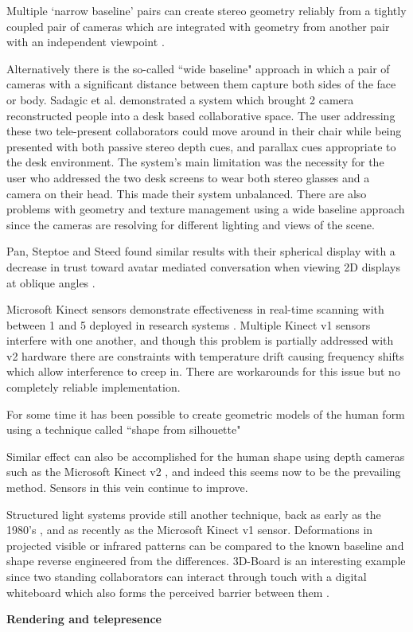 Multiple `narrow baseline' pairs can create stereo geometry reliably from a tightly coupled pair of cameras which are integrated with geometry from another pair with an independent viewpoint \cite{Okutomi:1993ez, Cooke2002, Cooke2002a}. \par
Alternatively there is the so-called ``wide baseline" approach in which a pair of cameras with a significant distance between them capture both sides of the face or body. Sadagic et al. demonstrated a system which brought 2 camera reconstructed \cite{Sadagic2001} people into a desk based collaborative space. The user addressing these two tele-present collaborators could move around in their chair while being presented with both passive stereo depth cues, and parallax cues appropriate to the desk environment. The system's main limitation was the necessity for the user who addressed the two desk screens to wear both stereo glasses and a camera on their head. This made their system unbalanced.  There are also problems with geometry and texture management using a wide baseline approach since the cameras are resolving for different lighting and views of the scene.\par
      Pan, Steptoe and Steed found similar results with their spherical display with a decrease in trust toward avatar mediated conversation when viewing 2D displays at oblique angles \cite{pan2014comparing}.\par
Microsoft Kinect sensors demonstrate effectiveness in real-time scanning with between 1 and 5 deployed in research systems \cite{Mekuria2013}. Multiple Kinect v1 sensors interfere with one another, and though this problem is partially addressed with v2 hardware there are constraints with temperature drift causing frequency shifts which allow interference to creep in. There are workarounds for this issue but no completely reliable implementation.\par

                For some time it has been possible to create geometric models of the human form using a technique called ``shape from silhouette" \cite{Allard2006, Petit:2008tva,Matusik2000,Starck2008,Franco2003,Baumgart1975,Laurentini1994a,Grau2007,Waizenegger2011,Franco2009,Feldmann2009,Cooke2000, Starck2003}\par
                Similar effect can also be accomplished for the human shape using depth cameras such as the Microsoft Kinect v2 \cite{Maimone2011}, and indeed this seems now to be the prevailing method. Sensors in this vein continue to improve.\par
       Structured light systems provide still another technique, back as early as the 1980's \cite{Hu:1986ww}, and as recently as the Microsoft Kinect v1 sensor. Deformations in projected visible or infrared patterns can be compared to the known baseline and shape reverse engineered from the differences. 3D-Board is an interesting example since two standing collaborators can interact through touch with a digital whiteboard which also forms the perceived barrier between them \cite{Zillner2014}.\par
       \textbf{Rendering and telepresence}
       
